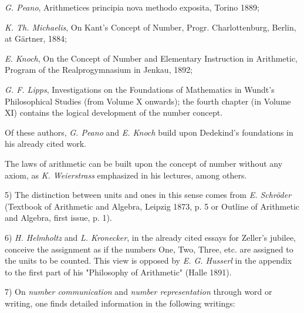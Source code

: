 \vspace{-0.1cm}
\leftline{\rule{2in}{0.4pt}}
\vspace{0.2cm}
{
\footnotesize

\textit{G. Peano}, Arithmetices principia nova methodo exposita, Torino 1889;

\textit{K. Th. Michaelis}, On Kant's Concept of Number, Progr. Charlottenburg, Berlin, at Gärtner, 1884;

\textit{E. Knoch}, On the Concept of Number and Elementary Instruction in Arithmetic, Program of the Realprogymnasium in Jenkau, 1892;

\textit{G. F. Lipps}, Investigations on the Foundations of Mathematics in Wundt's Philosophical Studies (from Volume X onwards); the fourth chapter (in Volume XI) contains the logical development of the number concept.

Of these authors, \textit{G. Peano} and \textit{E. Knoch} build upon Dedekind's foundations in his already cited work.

The laws of arithmetic can be built upon the concept of number without any axiom, as \textit{K. Weierstrass} emphasized in his lectures, among others.

5) The distinction between units and ones in this sense comes from \textit{E. Schröder} (Textbook of Arithmetic and Algebra, Leipzig 1873, p. 5 or Outline of Arithmetic and Algebra, first issue, p. 1).

6) \textit{H. Helmholtz} and \textit{L. Kronecker}, in the already cited essays for Zeller's jubilee, conceive the assignment as if the numbers One, Two, Three, etc. are assigned to the units to be counted. This view is opposed by \textit{E. G. Husserl} in the appendix to the first part of his "Philosophy of Arithmetic" (Halle 1891).

7) On \textit{number communication} and \textit{number representation} through word or writing, one finds detailed information in the following writings:

}
